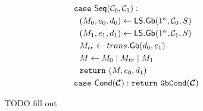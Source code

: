 \begin{figure}
\begin{adjustwidth}{-0.1\textwidth}{-0.1\textwidth}
\begin{minipage}[t]{0.40\linewidth}
\begin{align*}
      &~~~~\ccase~\sequential(\cir_0, \cir_1):\\
      &~~~~~~(\mat_0, e_0, d_0) \gets \ourscheme.\gGb(1^\kappa,\cir_0, S)\\
      &~~~~~~(\mat_1, e_1, d_1) \gets \ourscheme.\gGb(1^\kappa,\cir_1, S)\\
      &~~~~~~\mat_{tr} \gets \gbtranslate(d_0,e_1)\\
      &~~~~~~\mat \gets \mat_0\mid \mat_{tr}\mid \mat_1\\
      &~~~~~~\creturn~(\mat, e_0, d_1)\\
      &~~~~\ccase~\conditional(\vec \cir): \creturn~\gbcond(\vec \cir)\\
    \end{align*}
  \end{minipage}
  \end{adjustwidth}
  \caption{%
    TODO fill out
  }\label{fig:scheme}
\end{figure}


